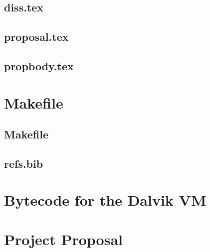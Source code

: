 \documentclass[12pt,twoside,notitlepage]{report}
\begin{document}
\section{diss.tex}
{\scriptsize}

\section{proposal.tex}
{\scriptsize}

\section{propbody.tex}
{\scriptsize}



\cleardoublepage

\chapter{Makefile}

\section{\label{makefile}Makefile}
{\scriptsize}

\section{refs.bib}
{\scriptsize}


\cleardoublepage

\chapter{Bytecode for the Dalvik VM}

% 


\cleardoublepage

\chapter{Project Proposal}


\end{document}
